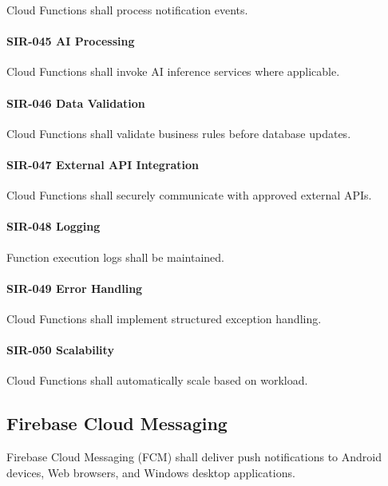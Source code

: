 Cloud Functions shall process notification events.

\paragraph{SIR-045 AI Processing}

Cloud Functions shall invoke AI inference services where applicable.

\paragraph{SIR-046 Data Validation}

Cloud Functions shall validate business rules before database updates.

\paragraph{SIR-047 External API Integration}

Cloud Functions shall securely communicate with approved external APIs.

\paragraph{SIR-048 Logging}

Function execution logs shall be maintained.

\paragraph{SIR-049 Error Handling}

Cloud Functions shall implement structured exception handling.

\paragraph{SIR-050 Scalability}

Cloud Functions shall automatically scale based on workload.


\subsection{Firebase Cloud Messaging}

Firebase Cloud Messaging (FCM) shall deliver push notifications to
Android devices, Web browsers, and Windows desktop applications.

